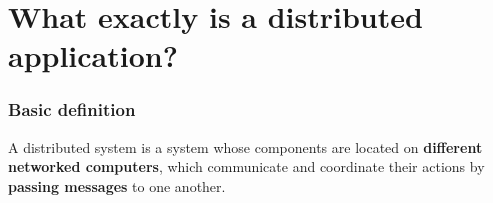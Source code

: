 \section{What exactly is a distributed application?}

\frame{\tableofcontents[currentsection]}

\begin{frame}
    \frametitle{Basic definition}
    A distributed system is a system whose components are located on \textbf{different networked computers},
    which communicate and coordinate their actions by \textbf{passing messages} to one another.
    
    \vfill
    
\end{frame}
